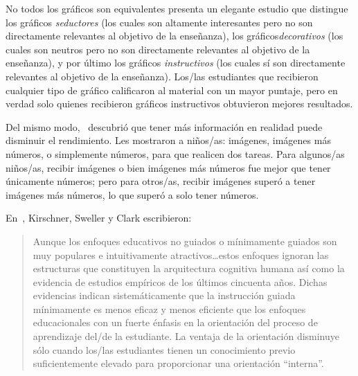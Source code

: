 \begin{aside}{No todos los gráficos son equivalentes}
  \cite{Sung2012} presenta un elegante estudio que distingue los gráficos \emph{seductores}
  (los cuales son altamente interesantes pero no son directamente relevantes al objetivo de la enseñanza),
  los gráficos\emph{decorativos}
  (los cuales son neutros pero no son directamente relevantes al objetivo de la enseñanza),
  y por último
  los gráficos \emph{instructivos}
  (los cuales sí son directamente relevantes al objetivo de la enseñanza).
  Los/las estudiantes que recibieron cualquier tipo de gráfico calificaron al material
  con un mayor puntaje, pero en verdad solo quienes recibieron gráficos instructivos
  obtuvieron mejores resultados.
  
  Del mismo modo,~\cite{Stam2013,Stam2014} descubrió que
  tener más información en realidad puede disminuir el rendimiento.
  Les mostraron a niños/as: imágenes, imágenes más números, o simplemente números,
  para que realicen dos tareas. 
  Para algunos/as niños/as, recibir imágenes o bien imágenes más números fue mejor que tener únicamente números;
  pero para otros/as, recibir imágenes superó a tener imágenes más números,
  lo que superó a solo tener números.
\end{aside}


En~\cite{Kirs2006}, Kirschner, Sweller y Clark escribieron:

\begin{quote}
 
  Aunque los enfoques educativos no guiados o mínimamente guiados son muy    
  populares e intuitivamente atractivos{\ldots}estos enfoques ignoran 
  las estructuras que constituyen la arquitectura cognitiva humana así como
  la evidencia de estudios empíricos de los últimos cincuenta años. Dichas evidencias
  indican sistemáticamente que la instrucción guiada mínimamente es menos eficaz y
  menos eficiente que los enfoques educacionales con un fuerte énfasis
  en la orientación del proceso de aprendizaje del/de la estudiante.
  La ventaja de la orientación disminuye sólo cuando los/las estudiantes
  tienen un conocimiento previo suficientemente elevado para proporcionar una orientación ``interna''.
\end{quote}

